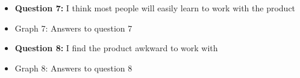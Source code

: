 \documentclass{article}
\begin{document}
\newpage
\begin{itemize}
		\item[] \textbf{Question 7:} I think most people will easily learn to work with the product
		\item[] \begin{minipage}[t]{\linewidth}
         	 \raggedright
          	\medskip
          	\centerline{Graph 7: Answers to question 7}
          \end{minipage}
\end{itemize}
\begin{itemize}
		\item[] \textbf{Question 8:} I find the product awkward to work with
		\item[] \begin{minipage}[t]{\linewidth}
         	 \raggedright
          	\medskip
          	\centerline{Graph 8: Answers to question 8}
          \end{minipage}
\end{itemize}
\end{document}
